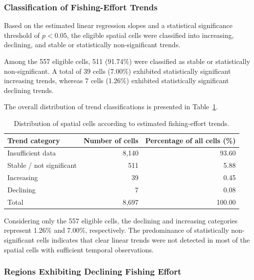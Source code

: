 \documentclass[pdflatex,sn-mathphys-num]{sn-jnl}
\theoremstyle{thmstyleone}
\theoremstyle{thmstyletwo}
\theoremstyle{thmstylethree}
\begin{document}
\subsubsection{Classification of Fishing-Effort Trends}

Based on the estimated linear regression slopes
and a statistical significance threshold of
$p < 0.05$, the eligible spatial cells were
classified into increasing, declining, and
stable or statistically non-significant trends.

Among the 557 eligible cells, 511 (91.74\%)
were classified as stable or statistically
non-significant. A total of 39 cells (7.00\%)
exhibited statistically significant increasing
trends, whereas 7 cells (1.26\%) exhibited
statistically significant declining trends.

The overall distribution of trend classifications
is presented in Table~\ref{tab:trend-classification}.

\begin{table}[!htbp]
\centering
\caption{Distribution of spatial cells according
to estimated fishing-effort trends.}
\label{tab:trend-classification}
\small
\begin{tabular}{lrr}
\toprule
Trend category & Number of cells & Percentage of all cells (\%) \\
\midrule
Insufficient data & 8,140 & 93.60 \\
Stable / not significant & 511 & 5.88 \\
Increasing & 39 & 0.45 \\
Declining & 7 & 0.08 \\
\midrule
Total & 8,697 & 100.00 \\
\bottomrule
\end{tabular}
\end{table}

\FloatBarrier

Considering only the 557 eligible cells,
the declining and increasing categories
represent 1.26\% and 7.00\%, respectively.
The predominance of statistically non-significant
cells indicates that clear linear trends were
not detected in most of the spatial cells
with sufficient temporal observations.



\subsubsection{Regions Exhibiting Declining Fishing Effort}
\end{document}
